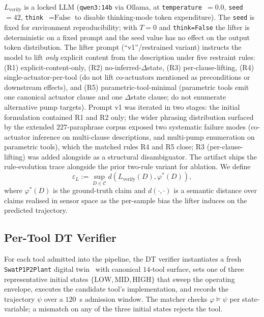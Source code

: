 $L_{\text{verify}}$ is a locked LLM (\texttt{qwen3:14b} via Ollama, at
\texttt{temperature}~$=0.0$, \texttt{seed}~$=42$, \texttt{think}~$=
\text{False}$ to disable thinking-mode token expenditure). The
\texttt{seed} is fixed for environment reproducibility; with $T=0$
and \texttt{think=False} the lifter is deterministic on a fixed
prompt and the seed value has no effect on the output token
distribution. The lifter prompt (``v1''/restrained variant) instructs
the model to lift \emph{only} explicit content from the description
under five restraint rules: (R1) explicit-content-only,
(R2) no-inferred-$\Delta$state, (R3) per-clause-lifting,
(R4) single-actuator-per-tool (do not lift co-actuators mentioned as
preconditions or downstream effects), and (R5) parametric-tool-minimal
(parametric tools emit one canonical actuator clause and one
$\Delta$state clause; do not enumerate alternative pump targets).
Prompt v1 was iterated in two stages: the initial formulation
contained R1 and R2 only; the wider phrasing distribution surfaced by
the extended $227$-paraphrase corpus exposed two systematic
failure modes (co-actuator inference on multi-clause descriptions,
and multi-pump enumeration on parametric tools), which the matched
rules R4 and R5 close; R3 (per-clause-lifting) was added alongside as
a structural disambiguator. The artifact ships the rule-evolution
trace alongside the prior two-rule variant for ablation.
We define
\[
\varepsilon_L := \sup_{D \in \mathcal{C}} d\!\left(L_{\text{verify}}(D),
                                                 \varphi^{*}(D)\right),
\]
where $\varphi^{*}(D)$ is the ground-truth claim and $d(\cdot, \cdot)$
is a semantic distance over claims realised in sensor space as the
per-sample bias the lifter induces on the predicted trajectory.

\subsection{Per-Tool DT Verifier}

For each tool admitted into the pipeline, the DT verifier instantiates
a fresh \texttt{SwatP1P2Plant} digital twin~\cite{minicps} with
canonical $14$-tool surface, sets one of three representative initial
states $\{\text{LOW}, \text{MID}, \text{HIGH}\}$ that sweep the
operating envelope, executes the candidate tool's implementation, and
records the trajectory $\psi$ over a $120$~s admission window. The
matcher checks $\varphi \models \psi$ per state-variable; a mismatch
on any of the three initial states rejects the tool.

